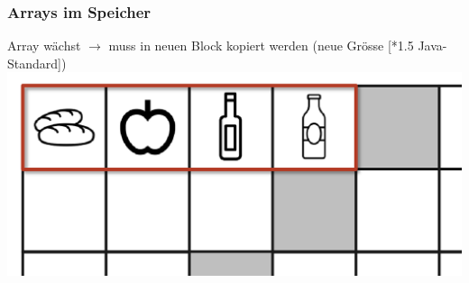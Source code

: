 \documentclass[a4paper, landscape, 8pt]{scrartcl}
\begin{document}
\begin{multicols*}{4}
                \subsubsection{Arrays im Speicher}
                    Array wächst $\to$ muss in neuen Block kopiert werden (neue Grösse [*1.5 Java-Standard])
                    \newline
                    \includegraphics[scale=0.13]{graphic/00_array_im_speicher}
        

\end{multicols*}
\end{document}
